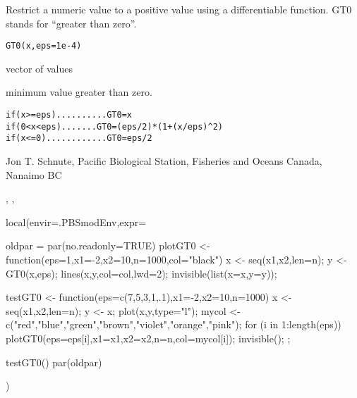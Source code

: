 \documentclass[letterpaper]{book}
\begin{document}
%
\begin{Description}\relax
Restrict a numeric value  to a positive value using a differentiable function. 
GT0 stands for ``greater than zero''.
\end{Description}
%
\begin{Usage}
\begin{verbatim}
GT0(x,eps=1e-4)
\end{verbatim}
\end{Usage}
%
\begin{Arguments}
\begin{ldescription}
\item[\code{x}] vector of values
\item[\code{eps}] minimum value greater than zero.
\end{ldescription}
\end{Arguments}
%
\begin{Details}\relax
\begin{alltt}
   if (x >= eps)..........GT0 = x
   if (0 < x < eps).......GT0 = (eps/2) * (1 + (x/eps)^2)
   if (x <= 0)............GT0 = eps/2
  \end{alltt}

\end{Details}
%
\begin{Author}\relax
Jon T. Schnute, Pacific Biological Station, Fisheries and Oceans Canada, Nanaimo BC
\end{Author}
%
\begin{SeeAlso}\relax
{}, , 
\end{SeeAlso}
%
\begin{Examples}
\begin{ExampleCode}
local(envir=.PBSmodEnv,expr={
  oldpar = par(no.readonly=TRUE)
  plotGT0 <- function(eps=1,x1=-2,x2=10,n=1000,col="black") {
    x <- seq(x1,x2,len=n); y <- GT0(x,eps);
    lines(x,y,col=col,lwd=2); invisible(list(x=x,y=y)); }

  testGT0 <- function(eps=c(7,5,3,1,.1),x1=-2,x2=10,n=1000) {
    x <- seq(x1,x2,len=n); y <- x;
    plot(x,y,type="l");
    mycol <- c("red","blue","green","brown","violet","orange","pink");
    for (i in 1:length(eps)) 
      plotGT0(eps=eps[i],x1=x1,x2=x2,n=n,col=mycol[i]);
    invisible(); };

  testGT0()
  par(oldpar)
})
\end{ExampleCode}
\end{Examples}
\end{document}
